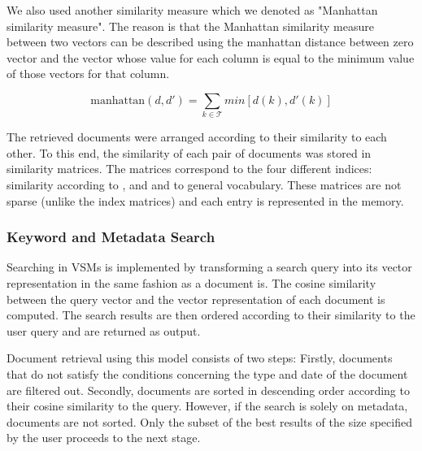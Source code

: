We also used another similarity measure which we denoted as "Manhattan similarity measure". The reason is that the Manhattan similarity measure between two vectors can be described using the manhattan distance between zero vector and the vector whose value for each column is equal to the minimum value of those vectors for that column.

\[\text{manhattan}(d,d') = \sum_{k \in \mathcal{T}}min[d(k), d'(k)]\]



The retrieved documents were arranged according to their similarity to each other. To this end, the similarity of each pair of documents was stored in similarity matrices. The matrices correspond to the four different indices: similarity according to ,  and  and to general vocabulary. These matrices are not sparse (unlike the index matrices) and each entry is represented in the memory.   

\subsubsection{Keyword and Metadata Search}\label{sec:keyword_search}

Searching in VSMs is implemented by transforming a search query into its vector representation in the same fashion as a document is. The cosine similarity between the query vector and the vector representation of each document is computed. The search results are then ordered according to their similarity to the user query and are returned as output. 

Document retrieval using this model consists of two steps: Firstly, documents that do not satisfy the conditions concerning the type and date of the document are filtered out. Secondly, documents are sorted in descending order according to their cosine similarity to the query. However, if the search is solely on metadata, documents are not sorted. Only the subset of the best results of the size specified by the user proceeds to the next stage.

